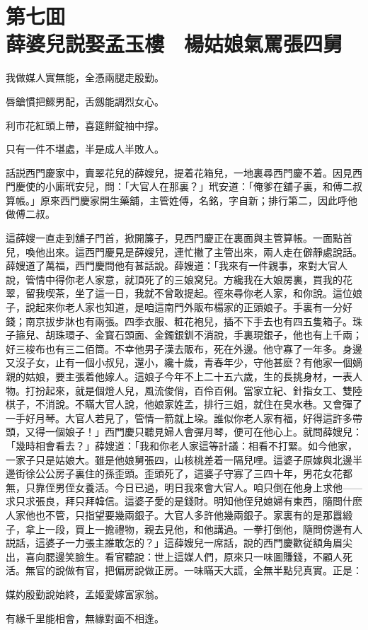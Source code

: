 
\chapter*{第七囬　\\薛婆兒説娶孟玉樓　楊姑娘氣罵張四舅}
\thispagestyle{empty}

\begin{myquote}
我做媒人實無能，全憑兩腿走殷勤。

唇鎗慣把鰥男配，舌劔能調烈女心。

利市花紅頭上帶，喜筵餅錠袖中撑。

只有一件不堪處，半是成人半敗人。
\end{myquote}

話説西門慶家中，賣翠花兒的薛嫂兒，提着花箱兒，一地裏尋西門慶不着。因見西門慶使的小廝玳安兒，問：「大官人在那裏？」玳安道：「俺爹在舖子裏，和傅二叔算帳。」原來西門慶家開生藥舖，主管姓傅，名銘，字自新；排行第二，因此呼他做傅二叔。

這薛嫂一直走到舖子門首，掀開簾子，見西門慶正在裏面與主管算帳。一面點首兒，喚他出來。這西門慶見是薛嫂兒，連忙撇了主管出來，兩人走在僻靜處說話。薛嫂道了萬福，西門慶問他有甚話說。薛嫂道：「我來有一件親事，來對大官人說，管情中得你老人家意，就頂死了的三娘窝兒。方纔我在大娘房裏，買我的花翠，留我喫茶，坐了這一日，我就不曾敢提起。徑來尋你老人家，和你說。這位娘子，說起來你老人家也知道，是咱這南門外販布楊家的正頭娘子。手裏有一分好錢；南京拔步牀也有兩張。四季衣服、粧花袍兒，插不下手去也有四五隻箱子。珠子箍兒、胡珠環子、金寳石頭面、金鐲銀釧不消說，手裏現銀子，他也有上千兩；好三梭布也有三二佰筒。不幸他男子漢去販布，死在外邊。他守寡了一年多。身邊又沒子女，止有一個小叔兒，還小，纔十歲，青春年少，守他甚麽？有他家一個嫡親的姑娘，要主張着他嫁人。這娘子今年不上二十五六歲，生的長挑身材，一表人物。打扮起來，就是個燈人兒，風流俊俏，百伶百俐。當家立紀、針指女工、雙陸棋子，不消說。不瞞大官人說，他娘家姓孟，排行三姐，就住在臭水巷。又會彈了一手好月琴。大官人若見了，管情一箭就上垜。誰似你老人家有福，好得這許多帶頭，又得一個娘子！」西門慶只聽見婦人會彈月琴，便可在他心上。就問薛嫂兒：「幾時相會看去？」薛嫂道：「我和你老人家這等計議：相看不打緊。如今他家，一家子只是姑娘大。雖是他娘舅張四，山核桃差着一隔兒哩。這婆子原嫁與北邊半邊街徐公公房子裏住的孫歪頭。歪頭死了，這婆子守寡了三四十年，男花女花都無，只靠侄男侄女養活。今日已過，明日我來會大官人。咱只倒在他身上求他——求只求張良，拜只拜韓信。這婆子愛的是錢財。明知他侄兒媳婦有東西，隨問什麽人家他也不管，只指望要幾兩銀子。大官人多許他幾兩銀子。家裏有的是那囂緞子，拿上一段，買上一擔禮物，親去見他，和他講過。一拳打倒他，隨問傍邊有人説話，這婆子一力張主誰敢怎的？」這薛嫂兒一席話，說的西門慶歡従額角眉尖出，喜向腮邊笑臉生。看官聽說：世上這媒人們，原來只一味圖賺錢，不顧人死活。無官的說做有官，把偏房說做正房。一味瞞天大謊，全無半點兒真實。正是：
\begin{myquote}
媒妁殷勤說始終，孟姬愛嫁富家翁。

有緣千里能相會，無緣對面不相逢。
\end{myquote}

